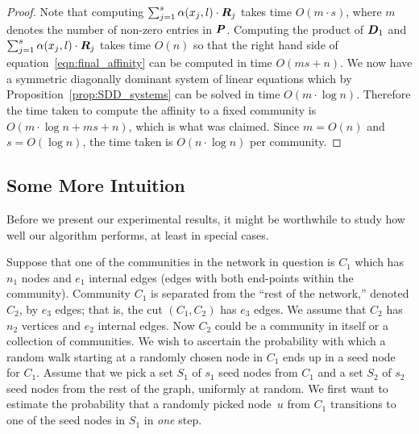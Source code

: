 \begin{proof}
Note that computing $\sum_{j = 1}^{s} \alpha (x_j, l) \cdot \boldsymbol{R}_j$ takes time $O(m \cdot s)$, where $m$ 
denotes the number of non-zero entries in $\boldsymbol{P}$. Computing the product of 
$\boldsymbol{D}_1$ and $\sum_{j = 1}^{s} \alpha (x_j, l) \cdot \boldsymbol{R}_j$ takes time $O(n)$ so that 
the right hand side of equation~\ref{eqn:final_affinity} can be computed in time $O(ms + n)$.
We now have a symmetric diagonally dominant system of linear equations which by 
Proposition~\ref{prop:SDD_systems} can be solved in time $O(m \cdot \log n)$. Therefore 
the time taken to compute the affinity to a fixed community is $O(m \cdot \log n + ms + n)$,
which is what was claimed. Since $m = O(n)$ and $s = O(\log n)$, the time taken 
is $O(n \cdot \log n)$ per community.  
%
\end{proof}

\subsection{Some More Intuition}

Before we present our experimental results, it might be 
worthwhile to study how well our algorithm performs, at least in 
special cases.

Suppose that one of the communities in the network in question is $C_1$
which has $n_1$ nodes and $e_1$ internal edges (edges with both end-points within 
the community). Community $C_1$ is separated from the ``rest of the network,'' 
denoted $C_2$, by $e_3$ edges; that is, the cut $(C_1, C_2)$ has $e_3$ edges. 
We assume that $C_2$ has $n_2$ vertices and $e_2$ internal edges. Now $C_2$ 
could be a community in itself or a collection of communities. We wish to 
ascertain the probability with which a random walk starting at a randomly 
chosen node in $C_1$ ends up in a seed node for $C_1$. Assume that we 
pick a set $S_1$ of $s_1$ seed nodes from $C_1$ and a set $S_2$ of $s_2$ 
seed nodes from the rest of the graph, uniformly at random. We first want to 
estimate the probability that a randomly picked node~$u$ from $C_1$ transitions 
to one of the seed nodes in $S_1$ in \emph{one} step.


